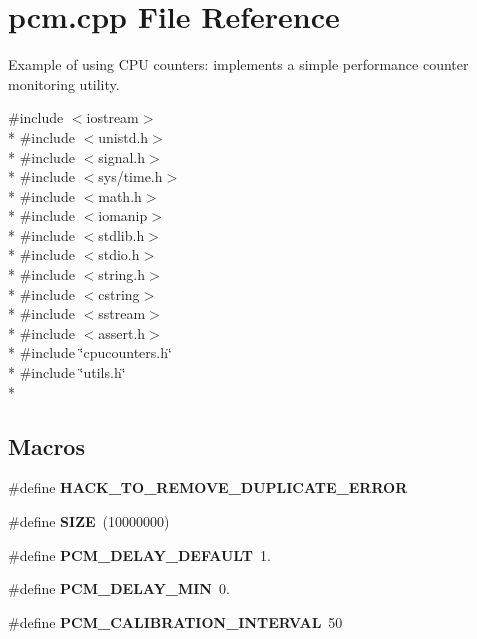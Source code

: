 \section{pcm.\+cpp File Reference}
\label{pcm_8cpp}


Example of using C\+P\+U counters\+: implements a simple performance counter monitoring utility.  


{\ttfamily \#include $<$iostream$>$}\\*
{\ttfamily \#include $<$unistd.\+h$>$}\\*
{\ttfamily \#include $<$signal.\+h$>$}\\*
{\ttfamily \#include $<$sys/time.\+h$>$}\\*
{\ttfamily \#include $<$math.\+h$>$}\\*
{\ttfamily \#include $<$iomanip$>$}\\*
{\ttfamily \#include $<$stdlib.\+h$>$}\\*
{\ttfamily \#include $<$stdio.\+h$>$}\\*
{\ttfamily \#include $<$string.\+h$>$}\\*
{\ttfamily \#include $<$cstring$>$}\\*
{\ttfamily \#include $<$sstream$>$}\\*
{\ttfamily \#include $<$assert.\+h$>$}\\*
{\ttfamily \#include \char`\"{}cpucounters.\+h\char`\"{}}\\*
{\ttfamily \#include \char`\"{}utils.\+h\char`\"{}}\\*
\subsection*{Macros}
\begin{DoxyCompactItemize}
\item 
\#define {\bfseries H\+A\+C\+K\+\_\+\+T\+O\+\_\+\+R\+E\+M\+O\+V\+E\+\_\+\+D\+U\+P\+L\+I\+C\+A\+T\+E\+\_\+\+E\+R\+R\+O\+R}\label{pcm_8cpp_ac4eeb11d89b0f517835a12a04443ebe4}

\item 
\#define {\bfseries S\+I\+Z\+E}~(10000000)\label{pcm_8cpp_a70ed59adcb4159ac551058053e649640}

\item 
\#define {\bfseries P\+C\+M\+\_\+\+D\+E\+L\+A\+Y\+\_\+\+D\+E\+F\+A\+U\+L\+T}~1.\label{pcm_8cpp_aa9ecc55c90c7a69729babc4f5f91ed96}

\item 
\#define {\bfseries P\+C\+M\+\_\+\+D\+E\+L\+A\+Y\+\_\+\+M\+I\+N}~0.\label{pcm_8cpp_acccbe8441d6dd75bdc949f5f0ee126c5}

\item 
\#define {\bfseries P\+C\+M\+\_\+\+C\+A\+L\+I\+B\+R\+A\+T\+I\+O\+N\+\_\+\+I\+N\+T\+E\+R\+V\+A\+L}~50\label{pcm_8cpp_a433dde946b6713059756318598c9a6fe}

\end{DoxyCompactItemize}
